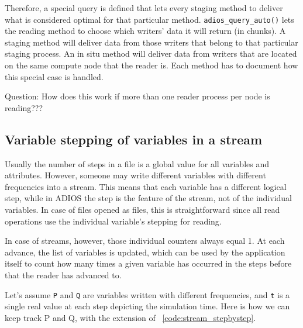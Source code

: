 Therefore, a special query is defined that lets every staging method to deliver what is considered optimal for that particular method. \lstinline+adios_query_auto()+ lets the reading method to choose which writers' data it will return (in chunks). A staging method will deliver data from those writers that belong to that particular staging process. An in situ method will deliver data from writers that are located on the same compute node that the reader is. Each method has to document how this special case is handled. 

{\color{red}Question: How does this work if more than one reader process per node is reading???}


\label {label_section_variable_stepping}
\subsection {Variable stepping of variables in a stream}
Usually the number of steps in a file is a global value for all variables and attributes. However, someone may write different variables with different frequencies into a stream. This means that each variable has a different logical step, while in ADIOS the step is the feature of the stream, not of the individual variables. In case of files opened as files, this is straightforward since all read operations use the individual variable's stepping for reading. 

In case of streams, however, those individual counters always equal 1. At each advance, the list of variables is updated, which can be used by the application itself to count how many times a given variable has occurred in the steps before that the reader has advanced to. 

Let's assume \verb+P+ and \verb+Q+ are variables written with different frequencies, and \verb+t+ is a single real value at each step depicting the simulation time. Here is how we can keep track P and Q, with the extension of  \lstlistingname~\ref{code:stream_stepbystep}.

